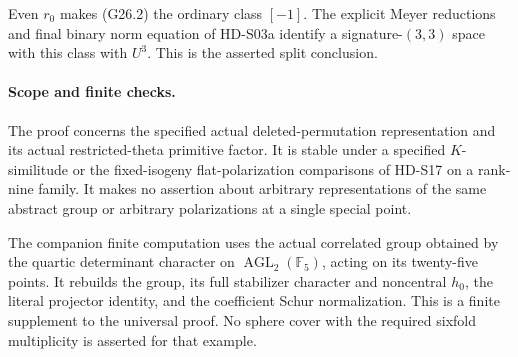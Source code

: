 Even \(r_0\) makes (G26.2) the ordinary class \([-1]\).
The explicit Meyer reductions and final binary norm equation
of HD-S03a identify a signature-\((3,3)\) space with this
class with \(U^3\). This is the asserted split conclusion.

\paragraph{Scope and finite checks.}
The proof concerns the specified actual deleted-permutation
representation and its actual restricted-theta primitive factor.
It is stable under a specified \(K\)-similitude or the
fixed-isogeny flat-polarization comparisons of HD-S17 on a
rank-nine family. It makes no assertion about arbitrary
representations of the same abstract group or arbitrary
polarizations at a single special point.

The companion finite computation uses the actual correlated
group obtained by the quartic determinant character on
\(\operatorname{AGL}_2(\mathbb F_5)\), acting on its
twenty-five points. It rebuilds the group, its full stabilizer
character and noncentral \(h_0\), the literal projector
identity, and the coefficient Schur normalization. This is
a finite supplement to the universal proof. No sphere cover
with the required sixfold multiplicity is asserted for that
example.
